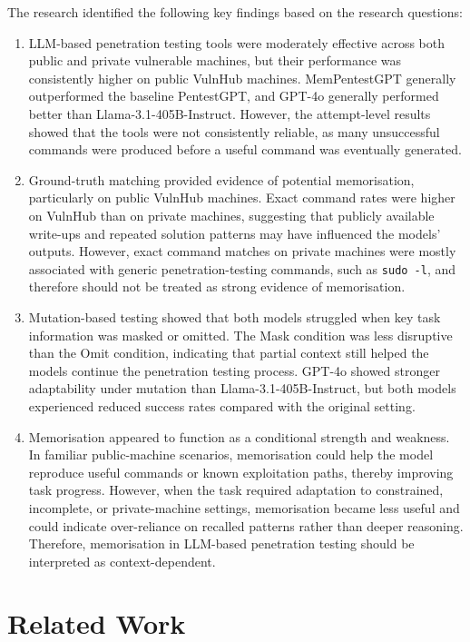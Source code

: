 \documentclass[acmtog]{acmart}
\begin{document}
The research identified the following key findings based on the research questions:
\begin{enumerate}
  \item LLM-based penetration testing tools were moderately effective across both public and private vulnerable machines, but their performance was consistently higher on public VulnHub machines. MemPentestGPT generally outperformed the baseline PentestGPT, and GPT-4o generally performed better than Llama-3.1-405B-Instruct. However, the attempt-level results showed that the tools were not consistently reliable, as many unsuccessful commands were produced before a useful command was eventually generated.

  \item Ground-truth matching provided evidence of potential memorisation, particularly on public VulnHub machines. Exact command rates were higher on VulnHub than on private machines, suggesting that publicly available write-ups and repeated solution patterns may have influenced the models' outputs. However, exact command matches on private machines were mostly associated with generic penetration-testing commands, such as \texttt{sudo -l}, and therefore should not be treated as strong evidence of memorisation.

  \item Mutation-based testing showed that both models struggled when key task information was masked or omitted. The Mask condition was less disruptive than the Omit condition, indicating that partial context still helped the models continue the penetration testing process. GPT-4o showed stronger adaptability under mutation than Llama-3.1-405B-Instruct, but both models experienced reduced success rates compared with the original setting.

  \item Memorisation appeared to function as a conditional strength and weakness. In familiar public-machine scenarios, memorisation could help the model reproduce useful commands or known exploitation paths, thereby improving task progress. However, when the task required adaptation to constrained, incomplete, or private-machine settings, memorisation became less useful and could indicate over-reliance on recalled patterns rather than deeper reasoning. Therefore, memorisation in LLM-based penetration testing should be interpreted as context-dependent.
\end{enumerate}

\section{Related Work}
\end{document}

